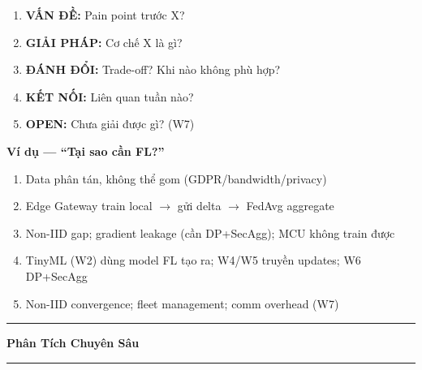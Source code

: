 \documentclass[9pt,a4paper,twocolumn]{article}
\begin{document}
\begin{tcolorbox}[deepbox, title={Framework Trả Lời Tự Luận (5 bước)}]
\begin{enumerate}
  \item \textbf{VẤN ĐỀ:} Pain point trước X?
  \item \textbf{GIẢI PHÁP:} Cơ chế X là gì?
  \item \textbf{ĐÁNH ĐỔI:} Trade-off? Khi nào không phù hợp?
  \item \textbf{KẾT NỐI:} Liên quan tuần nào?
  \item \textbf{OPEN:} Chưa giải được gì? (W7)
\end{enumerate}

\textbf{Ví dụ --- ``Tại sao cần FL?''}
\begin{enumerate}
  \item Data phân tán, không thể gom (GDPR/bandwidth/privacy)
  \item Edge Gateway train local $\rightarrow$ gửi delta $\rightarrow$ FedAvg aggregate
  \item Non-IID gap; gradient leakage (cần DP+SecAgg); MCU không train được
  \item TinyML (W2) dùng model FL tạo ra; W4/W5 truyền updates; W6 DP+SecAgg
  \item Non-IID convergence; fleet management; comm overhead (W7)
\end{enumerate}

\end{tcolorbox}

\vspace{4pt}
\hrule
\vspace{2pt}
\begin{center}{\small\bfseries Phân Tích Chuyên Sâu}\end{center}
\vspace{2pt}
\hrule
\vspace{4pt}
\end{document}
